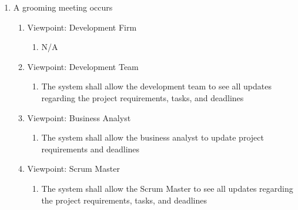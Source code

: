 \documentclass[12pt, titlepage]{article}
\begin{document}
\begin{enumerate}[{BE}1.]
    \item A grooming meeting occurs %
    \begin{enumerate}[{VP}1.] 
        \item Viewpoint: Development Firm
            \begin{enumerate}
                \item[] N/A
            \end{enumerate}
        \item Viewpoint: Development Team
            \begin{enumerate}
                \item The system shall allow the development team to see all updates regarding the project requirements, tasks, and deadlines
            \end{enumerate}
        \item Viewpoint: Business Analyst
            \begin{enumerate}
                \item The system shall allow the business analyst to update project requirements and deadlines
            \end{enumerate}
        \item Viewpoint: Scrum Master
            \begin{enumerate}
                \item The system shall allow the Scrum Master to see all updates regarding the project requirements, tasks, and deadlines
            \end{enumerate}
    \end{enumerate}


\end{enumerate}
\end{document}
